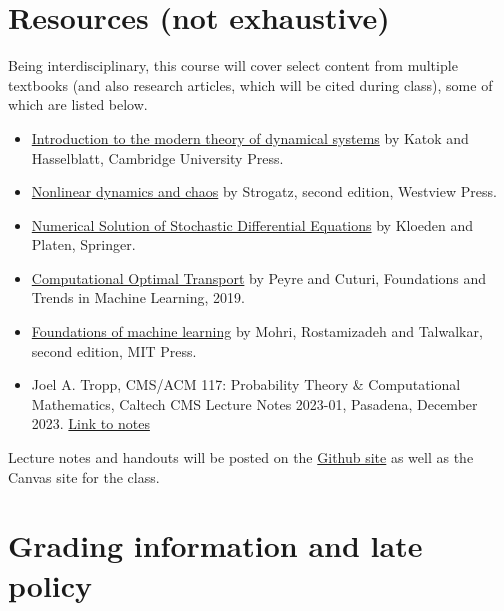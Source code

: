 \documentclass[12pt]{article}
\begin{document}
\section{Resources (not exhaustive)}
\label{sec:resources}
Being interdisciplinary, this course will cover select content from multiple textbooks (and also research articles, which will be cited during class), some of which are listed below. 
\begin{itemize}
	\item 
		\href{https://books.google.com/books?hl=en&lr=&id=9nL7ZX8Djp4C&oi=fnd&pg=PR7&dq=katok+and+hasselblatt&ots=oWieU2cCAH&sig=T-g4-msNhCCTTpoSyMb09ZhnF2Y#v=onepage&q=katok%20and%20hasselblatt&f=false}{Introduction to the modern theory of dynamical systems} by Katok and Hasselblatt, Cambridge University Press.
	\item  \href{https://books.google.com/books?hl=en&lr=&id=wUBvDwAAQBAJ&oi=fnd&pg=PT7&ots=AOtaTsiIyX&sig=MexxyAiFbXhsxZNKq6V7YLjjv5w#v=onepage&q&f=false}{Nonlinear dynamics and chaos} by Strogatz, second edition, Westview Press.
	\item \href{https://link.springer.com/book/10.1007/978-3-662-12616-5}{Numerical Solution of Stochastic Differential Equations} by Kloeden and Platen, Springer. 

	\item \href{https://www.nowpublishers.com/article/Details/MAL-073}{Computational Optimal Transport} by Peyre and Cuturi, Foundations and Trends in Machine Learning, 2019.
	\item \href{https://books.google.com/books?hl=en&lr=&id=dWB9DwAAQBAJ&oi=fnd&pg=PR5&dq=foundations+of+machine+learning+mohri&ots=AznTXOq_s4&sig=oFBecq2rS2nusMY-xRj1qD-0Dsk#v=onepage&q=foundations%20of%20machine%20learning%20mohri&f=false}{Foundations of machine learning} by Mohri, Rostamizadeh and Talwalkar, second edition, MIT Press.
	\item Joel A. Tropp, CMS/ACM 117: Probability Theory \& Computational Mathematics,
Caltech CMS Lecture Notes 2023-01, Pasadena, December 2023. \href{https://doi.org/10.7907/q75sz-e1e79}{Link to notes}
	
\end{itemize}
Lecture notes and handouts will be posted on the \href{https://github.com/ni-sha-c/Foundations-of-computational-dynamics/tree/main}{Github site} as well as the Canvas site for the class.

\section{Grading information and late policy}
\end{document}
